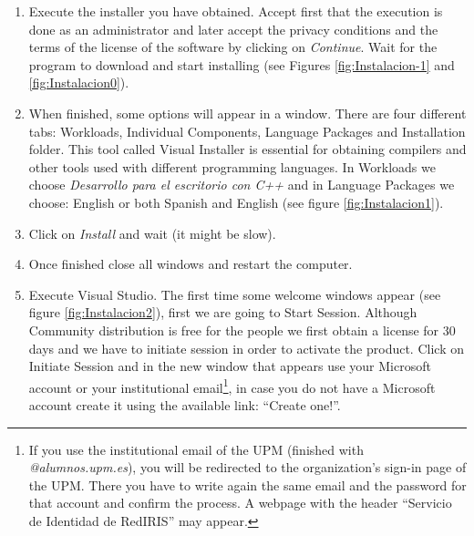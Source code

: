 \begin{enumerate}
    
    \item Execute the installer you have obtained. Accept first that the execution is done as an administrator and later accept the privacy conditions and the terms of the license of the software by clicking on \textit{Continue}. Wait for the program to download and start installing (see Figures \ref{fig:Instalacion-1} and \ref{fig:Instalacion0}).
    
    \item When finished, some options will appear in a window. There are four different tabs: Workloads, Individual Components, Language Packages and Installation folder. This tool called Visual Installer is essential for obtaining compilers and other tools used with different programming languages. In Workloads we choose \textit{Desarrollo para el escritorio con C++} and in Language Packages we choose: English or both Spanish and English (see figure \ref{fig:Instalacion1}).
    
    \item Click on \textit{Install} and wait (it might be slow).
    
    \item Once finished close all windows and restart the computer.
    
    \item Execute Visual Studio. The first time some welcome windows appear (see figure \ref{fig:Instalacion2}), first we are going to Start Session. Although Community distribution is free for the people we first obtain a license for 30 days and we have to initiate session in order to activate the product. Click on Initiate Session and in the new window that appears use your Microsoft account or your institutional email\footnote{If you use the institutional email of the UPM (finished with \textit{@alumnos.upm.es}), you will be redirected to the organization's sign-in page of the UPM. There you have to write again the same email and the password for that account and confirm the process. A webpage with the header ``Servicio de Identidad de RedIRIS'' may appear.}, in case you do not have a Microsoft account create it using the available link: ``Create one!''.
    

\end{enumerate}

